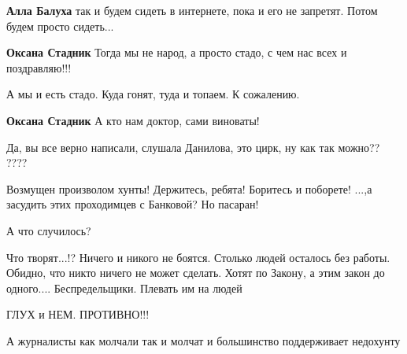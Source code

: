 \begin{itemize}
\begin{itemize} %
\textbf{Алла Балуха} так и будем сидеть в интернете, пока и его не запретят. Потом будем просто сидеть...

\textbf{Оксана Стадник} Тогда мы не народ, а просто стадо, с чем нас всех и поздравляю!!!

А мы и есть стадо. Куда гонят, туда и топаем. К сожалению.

\textbf{Оксана Стадник} А кто нам доктор, сами виноваты!
\end{itemize} %

Да, вы все верно написали, слушала Данилова, это цирк, ну как так можно?? ????


Возмущен произволом хунты! Держитесь, ребята! Боритесь и поборете! ...,а
засудить этих проходимцев с Банковой? Но пасаран!

А что случилось?


Что творят...!? Ничего и никого не боятся. Столько людей осталось без работы.
Обидно, что никто ничего не может сделать. Хотят по Закону, а этим закон до
одного.... Беспредельщики. Плевать им на людей

ГЛУХ и НЕМ. ПРОТИВНО!!!


А журналисты как молчали так и молчат и большинство поддерживает недохунту

\end{itemize} %


